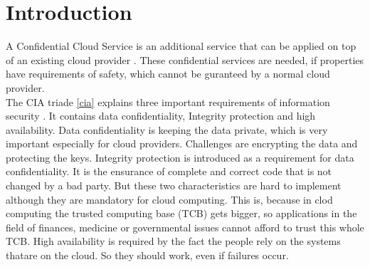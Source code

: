 \section{Introduction}
	A Confidential Cloud Service is an additional service that can be applied on top of an existing cloud provider \cite{confidentiality}. These confidential services are needed, if properties have requirements of safety, which cannot be guranteed by a normal cloud provider.   \\
	 The CIA triade \ref{cia} explains three important requirements of information security \cite{ciaBook} \cite{cia}. It contains data confidentiality, Integrity protection and high availability. Data confidentiality is keeping the data private, which is very important especially for cloud providers. Challenges are encrypting the data and protecting the keys. Integrity protection is introduced as a requirement for data confidentiality. It is the ensurance of complete and correct code that is not changed by a bad party. But these two characteristics are hard to implement although they are mandatory for cloud computing. This is, because in clod computing the trusted computing base (TCB) gets bigger, so applications in the field of finances, medicine or governmental issues cannot afford to trust this whole TCB. High availability is required by the fact the people rely on the systems thatare on the cloud. So they should work, even if failures occur.\\
	 